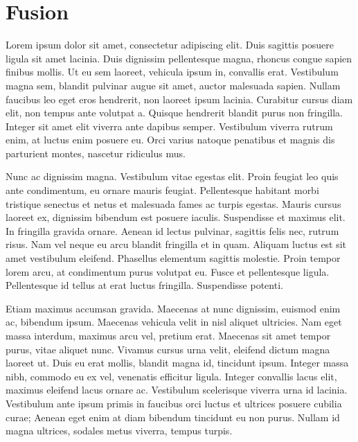 \documentclass[
  letterpaper,
  DIV=11,
  numbers=noendperiod]{scrreprt}
\begin{document}
\chapter{Fusion}\label{fusion}

Lorem ipsum dolor sit amet, consectetur adipiscing elit. Duis sagittis
posuere ligula sit amet lacinia. Duis dignissim pellentesque magna,
rhoncus congue sapien finibus mollis. Ut eu sem laoreet, vehicula ipsum
in, convallis erat. Vestibulum magna sem, blandit pulvinar augue sit
amet, auctor malesuada sapien. Nullam faucibus leo eget eros hendrerit,
non laoreet ipsum lacinia. Curabitur cursus diam elit, non tempus ante
volutpat a. Quisque hendrerit blandit purus non fringilla. Integer sit
amet elit viverra ante dapibus semper. Vestibulum viverra rutrum enim,
at luctus enim posuere eu. Orci varius natoque penatibus et magnis dis
parturient montes, nascetur ridiculus mus.

Nunc ac dignissim magna. Vestibulum vitae egestas elit. Proin feugiat
leo quis ante condimentum, eu ornare mauris feugiat. Pellentesque
habitant morbi tristique senectus et netus et malesuada fames ac turpis
egestas. Mauris cursus laoreet ex, dignissim bibendum est posuere
iaculis. Suspendisse et maximus elit. In fringilla gravida ornare.
Aenean id lectus pulvinar, sagittis felis nec, rutrum risus. Nam vel
neque eu arcu blandit fringilla et in quam. Aliquam luctus est sit amet
vestibulum eleifend. Phasellus elementum sagittis molestie. Proin tempor
lorem arcu, at condimentum purus volutpat eu. Fusce et pellentesque
ligula. Pellentesque id tellus at erat luctus fringilla. Suspendisse
potenti.

Etiam maximus accumsan gravida. Maecenas at nunc dignissim, euismod enim
ac, bibendum ipsum. Maecenas vehicula velit in nisl aliquet ultricies.
Nam eget massa interdum, maximus arcu vel, pretium erat. Maecenas sit
amet tempor purus, vitae aliquet nunc. Vivamus cursus urna velit,
eleifend dictum magna laoreet ut. Duis eu erat mollis, blandit magna id,
tincidunt ipsum. Integer massa nibh, commodo eu ex vel, venenatis
efficitur ligula. Integer convallis lacus elit, maximus eleifend lacus
ornare ac. Vestibulum scelerisque viverra urna id lacinia. Vestibulum
ante ipsum primis in faucibus orci luctus et ultrices posuere cubilia
curae; Aenean eget enim at diam bibendum tincidunt eu non purus. Nullam
id magna ultrices, sodales metus viverra, tempus turpis.
\end{document}
